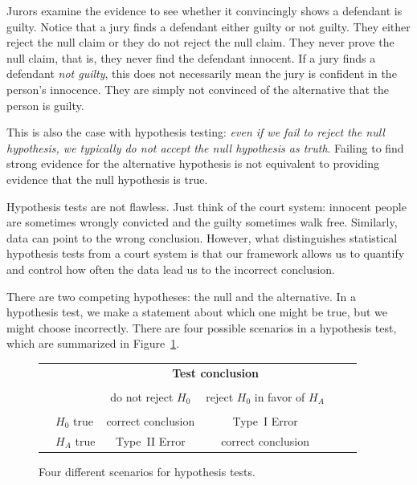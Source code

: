 Jurors examine the evidence to see whether it convincingly shows a defendant is guilty. Notice that a jury finds a defendant either guilty or not guilty. They either reject the null claim or they do not reject the null claim. They never prove the null claim, that is, they never find the defendant innocent. If a jury finds a defendant \emph{not guilty}, this does not necessarily mean the jury is confident in the person's innocence. They are simply not convinced of the alternative that the person is guilty.

This is also the case with hypothesis testing: \emph{even if we fail to reject the null hypothesis, we typically do not accept the null hypothesis as truth}. Failing to find strong evidence for the alternative hypothesis is not equivalent to providing evidence that the null hypothesis is true.


Hypothesis tests are not flawless. Just think of the court system: innocent people are sometimes wrongly convicted and the guilty sometimes walk free. Similarly, data can point to the wrong conclusion. However, what distinguishes statistical hypothesis tests from a court system is that our framework allows us to quantify and control how often the data lead us to the incorrect conclusion.

There are two competing hypotheses: the null and the alternative. In a hypothesis test, we make a statement about which one might be true, but we might choose incorrectly. There are four possible scenarios in a hypothesis test, which are summarized in Figure~\ref{fourHTScenarios}.

\begin{figure}[ht]
\centering
\begin{tabular}{l l c c c}
& & \multicolumn{2}{c}{\textbf{Test conclusion}} \\
  \cline{3-4}
\vspace{-3.7mm} \\
& & do not reject $H_0$ &  reject $H_0$ in favor of $H_A$ &
\ \hspace{7mm} \  \\
  \cline{2-4}
\vspace{-3.7mm} \\
& $H_0$ true & correct conclusion &  Type~I Error \\
\raisebox{1.5ex}{\textbf{Truth}} & $H_A$ true & Type~II Error & correct conclusion \\
  \cline{2-4}
\end{tabular}
\caption{Four different scenarios for hypothesis tests.}
\label{fourHTScenarios}
\end{figure}

